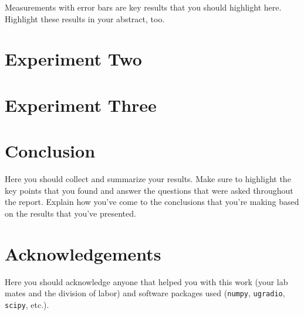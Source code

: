\documentclass[12pt,preprint]{aastex}
\begin{document}
Measurements with error bars are key results that you should highlight
here. Highlight these results in your abstract, too.

\section{Experiment Two}
\label{experiment2}

\section{Experiment Three}
\label{experiment3}

\section{Conclusion}
\label{conclusion}

Here you should collect and summarize your results. Make sure to highlight the
key points that you found and answer the questions that were asked throughout
the report. Explain how you’ve come to the conclusions that you’re making based
on the results that you’ve presented.

\section*{Acknowledgements}

Here you should acknowledge anyone that helped you with this work (your lab
mates and the division of labor) and software packages used (\texttt{numpy},
\texttt{ugradio}, \texttt{scipy}, etc.). 
\end{document}
